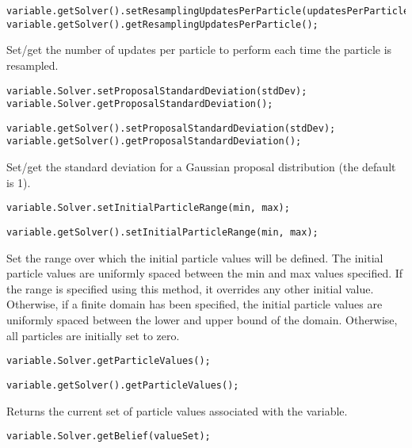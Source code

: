 \ifjava
\begin{lstlisting}
variable.getSolver().setResamplingUpdatesPerParticle(updatesPerParticle);
variable.getSolver().getResamplingUpdatesPerParticle();
\end{lstlisting}
\fi


Set/get the number of updates per particle to perform each time the particle is resampled.

\ifmatlab
\begin{lstlisting}
variable.Solver.setProposalStandardDeviation(stdDev);
variable.Solver.getProposalStandardDeviation();
\end{lstlisting}
\fi

\ifjava
\begin{lstlisting}
variable.getSolver().setProposalStandardDeviation(stdDev);
variable.getSolver().getProposalStandardDeviation();
\end{lstlisting}
\fi


Set/get the standard deviation for a Gaussian proposal distribution (the default is 1).

\ifmatlab
\begin{lstlisting}
variable.Solver.setInitialParticleRange(min, max);
\end{lstlisting}
\fi

\ifjava
\begin{lstlisting}
variable.getSolver().setInitialParticleRange(min, max);
\end{lstlisting}
\fi

Set the range over which the initial particle values will be defined. The initial particle values are uniformly spaced between the min and max values specified. If the range is specified using this method, it overrides any other initial value. Otherwise, if a finite domain has been specified, the initial particle values are uniformly spaced between the lower and upper bound of the domain. Otherwise, all particles are initially set to zero.

\ifmatlab
\begin{lstlisting}
variable.Solver.getParticleValues();
\end{lstlisting}
\fi

\ifjava
\begin{lstlisting}
variable.getSolver().getParticleValues();
\end{lstlisting}
\fi

Returns the current set of particle values associated with the variable.

\ifmatlab
\begin{lstlisting}
variable.Solver.getBelief(valueSet);
\end{lstlisting}
\fi

